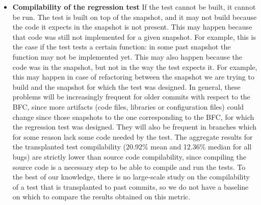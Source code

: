\begin{itemize}
\item \textbf{Compilability of the regression test} If the test cannot be built, it cannot be run. The test is built on top of the snapshot, and it may not build because the code it expects in the snapshot is not present. This may happen because that code was still not implemented for a given snapshot. For example, this is the case if the test tests a certain function: in some past snapshot the function may not be implemented yet. This may also happen because the code was in the snapshot, but not in the way the test expects it. For example, this may happen in case of refactoring between the snapshot we are trying to build and the snapshot for which the test was designed. In general, these problems will be increasingly frequent for older commits with respect to the BFC, since more artifacts (code files, libraries or configuration files) could change since those snapshots to the one corresponding to the BFC, for which the regression test was designed. They will also be frequent in branches which for some reason lack some code needed by the test.
The aggregate results for the transplanted test compilability (20.92\% mean and 12.36\% median for all bugs) are strictly lower than source code compilability, since compiling the source code is a necessary step to be able to compile and run the tests. 
To the best of our knowledge, there is no large-scale study on the compilability of a test that is transplanted to past commits, so we do not have a baseline on which to compare the results obtained on this metric.


\end{itemize}

